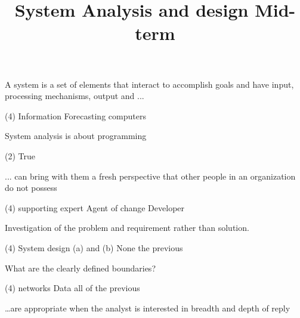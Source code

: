 \documentclass[10pt]{article}
\title{System Analysis and design Mid-term}
\date{}
\author{}
\begin{document}
\maketitle

\begin{questions}
    \begin{exercise}
        A system is a set of elements that interact to accomplish goals and have input, processing mechanisms, output and ...
        \begin{choice}(4)
            \choice Information
            \choice Forecasting
            \choice {}
            \choice computers
        \end{choice}
    \end{exercise}
    \begin{exercise}
        System analysis is about programming
        \begin{choice}(2)
            \choice True
            \choice {}
        \end{choice}
    \end{exercise}
    \begin{exercise}
        ... can bring with them a fresh perspective that other people in an organization do not possess
        \begin{choice}(4)
            \choice {}
            \choice supporting expert
            \choice Agent of change
            \choice Developer
        \end{choice}
    \end{exercise}
    \begin{exercise}
        Investigation of the problem and requirement rather than solution.
        \begin{choice}(4)
            \choice {}
            \choice System design
            \choice (a) and (b)
            \choice None the previous
        \end{choice}
    \end{exercise}
    \begin{exercise}
        What are the clearly defined boundaries?
        \begin{choice}(4)
            \choice {}
            \choice networks
            \choice Data
            \choice all of the previous
        \end{choice}
    \end{exercise}
    \begin{exercise}
        \dots are appropriate when the analyst is interested in breadth and depth of reply

\end{exercise}
\end{questions}
\end{document}
